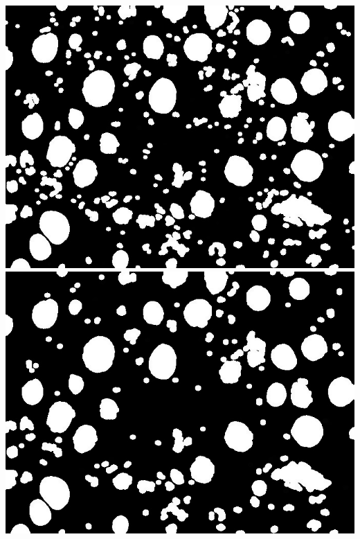 \documentclass[a4paper]{article}
\begin{document}
\begin{minipage}{0.24\textwidth}
    \centering
    \includegraphics[width=\textwidth]{../code/task1/output/kernel_size_9.jpg}
    \includegraphics[width=\textwidth]{../code/task1/output/kernel_size_11.jpg}
\end{minipage}
\hfill
\end{document}
